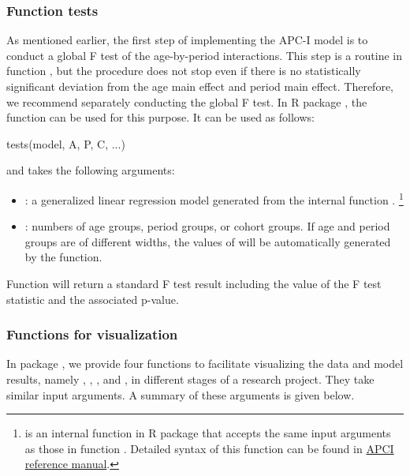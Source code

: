 \subsubsection{Function tests} \label{fun:tests}
As mentioned earlier, the first step of implementing the APC-I model is to conduct a global F test of the age-by-period interactions. This step is a routine in function {}, but the procedure does not stop even if there is no statistically significant deviation from the age main effect and period main effect. Therefore, we recommend separately conducting the global F test. In R package {}, the function {} can be used for this purpose. It can be used as follows:
\begin{example}
	tests(model, A, P, C, ...)
\end{example}

and takes the following arguments:

\begin{itemize}
\item {}: a generalized linear regression model generated from the internal function {}. \footnote{{ is an internal function in R package } that accepts the same input arguments as those in function {}. Detailed syntax of this function can be found in \href{https://cran.r-project.org/web/packages/APCI/APCI.pdf}{APCI reference manual}.}

\item {}: numbers of age groups, period groups, or cohort groups. If age and period groups are of different widths, the values of will be automatically generated by the function.

\end{itemize}

Function {} will return a standard F test result including the value of the F test statistic and the associated p-value.


\subsubsection{Functions for visualization} \label{fun:vis}

In package {}, we provide four functions to facilitate visualizing the data and model results, namely {}, {}, {}, and {}, in different stages of a research project. They take similar input arguments. A summary of these arguments is given below. 


